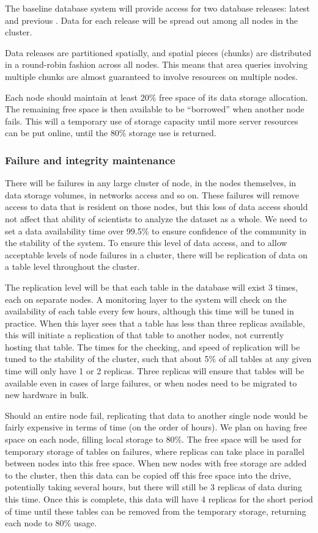 \documentclass[DM,lsstdraft,toc]{lsstdoc}
\begin{document}
The baseline database system will provide access for two database
releases: latest and previous . Data for each release will be spread out
among all nodes in the cluster.

Data releases are partitioned spatially, and spatial pieces (chunks) are
distributed in a round-robin fashion across all nodes. This means that
area queries involving multiple chunks are almost guaranteed to involve
resources on multiple nodes.

Each node should maintain at least 20\% free space of its data storage
allocation. The remaining free space is then available to be
``borrowed'' when another node fails. This will a temporary use of
storage capacity until more server resources can be put online, until
the 80\% storage use is returned.

\subsubsection{Failure and integrity
maintenance}\label{failure-and-integrity-maintenance}

There will be failures in any large cluster of node, in the nodes
themselves, in data storage volumes, in networks access and so on. These
failures will remove access to data that is resident on those nodes, but
this loss of data access should not affect that ability of scientists to
analyze the dataset as a whole. We need to set a data availability time
over 99.5\% to ensure confidence of the community in the stability of
the system. To ensure this level of data access, and to allow acceptable
levels of node failures in a cluster, there will be replication of data
on a table level throughout the cluster.

The replication level will be that each table in the database will exist
3 times, each on separate nodes. A monitoring layer to the system will
check on the availability of each table every few hours, although this
time will be tuned in practice. When this layer sees that a table has
less than three replicas available, this will initiate a replication of
that table to another nodes, not currently hosting that table. The times
for the checking, and speed of replication will be tuned to the
stability of the cluster, such that about 5\% of all tables at any given
time will only have 1 or 2 replicas. Three replicas will ensure that
tables will be available even in cases of large failures, or when nodes
need to be migrated to new hardware in bulk.

Should an entire node fail, replicating that data to another single node would
be fairly expensive in terms of time (on the order of hours).  We plan on
having free space on each node, filling local storage to 80\%. The free space
will be used for temporary storage of tables on failures, where replicas can
take place in parallel between nodes into this free space. When new nodes with
free storage are added to the cluster, then this data can be copied off this
free space into the drive, potentially taking several hours, but there will
still be 3 replicas of data during this time. Once this is complete, this data
will have 4 replicas for the short period of time until these tables can be
removed from the temporary storage, returning each node to 80\% usage.
\end{document}
